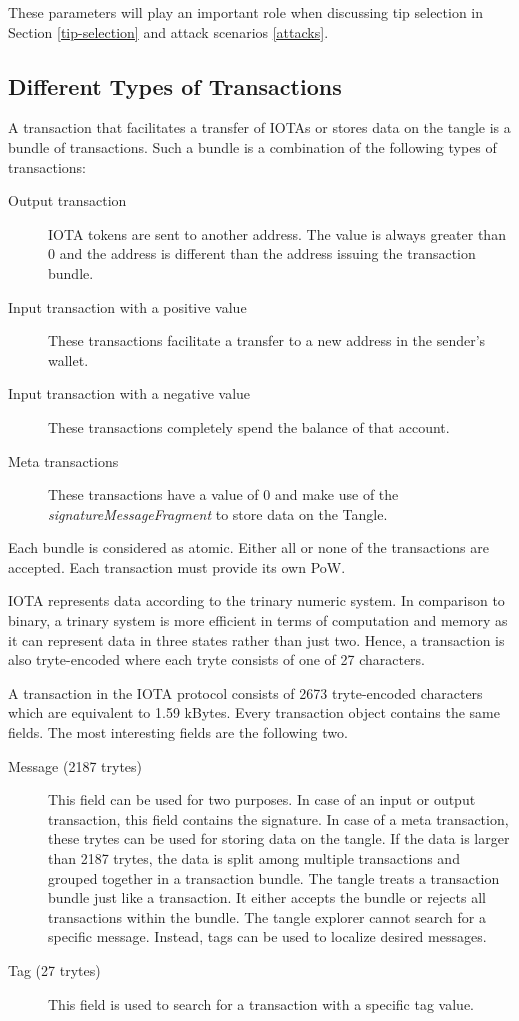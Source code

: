 These parameters will play an important role when discussing tip selection in Section \ref{tip-selection} and attack scenarios \ref{attacks}.

\subsection{Different Types of Transactions}\label{different-types-of-transactions}

A transaction that facilitates a transfer of IOTAs or stores data on the tangle is a bundle of transactions. Such a bundle is a combination of the following types of transactions:
\begin{description}
    \item[Output transaction] IOTA tokens are sent to another address. The value is always greater than 0 and the address is different than the address issuing the transaction bundle.
    \item[Input transaction with a positive value] These transactions facilitate a transfer to a new address in the sender's wallet.
    \item[Input transaction with a negative value] These transactions completely spend the balance of that account.
    \item[Meta transactions] These transactions have a value of 0 and make use of the \textit{signatureMessageFragment} to store data on the Tangle. 
\end{description}

Each bundle is considered as atomic. Either all or none of the transactions are accepted. Each transaction must provide its own PoW. 


IOTA represents data according to the trinary numeric system. In comparison to binary, a trinary system is more efficient in terms of computation and memory as it can represent data in three states rather than just two. Hence, a transaction is also tryte-encoded where each tryte consists of one of 27 characters.

A transaction in the IOTA protocol consists of 2673 tryte-encoded characters which are equivalent to 1.59 kBytes. Every transaction object contains the same fields. The most interesting fields are the following two.
\begin{description}
    \item[Message (2187 trytes)] This field can be used for two purposes. In case of an input or output transaction, this field contains the signature. In case of a meta transaction, these trytes can be used for storing data on the tangle. If the data is larger than 2187 trytes, the data is split among multiple transactions and grouped together in a transaction bundle. The tangle treats a transaction bundle just like a transaction. It either accepts the bundle or rejects all transactions within the bundle. The tangle explorer cannot search for a specific message. Instead, tags can be used to localize desired messages.
    \item[Tag (27 trytes)] This field is used to search for a transaction with a specific tag value.
\end{description}

